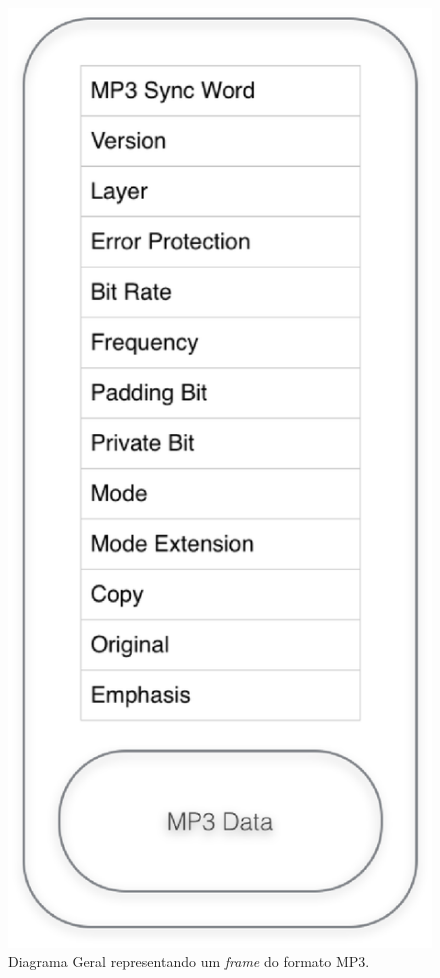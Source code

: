  \begin{figure}[ht]
	\centering
		\includegraphics[keepaspectratio=true,scale=0.5]{figuras/mp3.eps}
	\caption{Diagrama Geral representando um \textit{frame} do formato MP3.}
	\label{mp3}
\end{figure}

